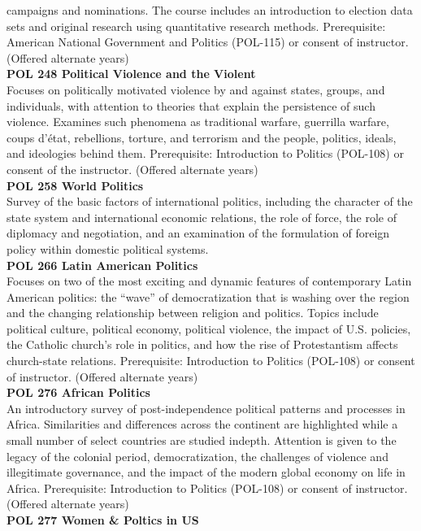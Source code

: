 \documentclass[
  letterpaper,
]{scrbook}
\begin{document}
campaigns and nominations. The course includes an introduction to
election data sets and original research using quantitative research
methods. Prerequisite: American National Government and Politics
(POL-115) or consent of instructor. (Offered alternate years)\\
\textbf{POL 248 Political Violence and the Violent}\\
Focuses on politically motivated violence by and against states, groups,
and individuals, with attention to theories that explain the persistence
of such violence. Examines such phenomena as traditional warfare,
guerrilla warfare, coups d'état, rebellions, torture, and terrorism and
the people, politics, ideals, and ideologies behind them. Prerequisite:
Introduction to Politics (POL-108) or consent of the instructor.
(Offered alternate years)\\
\textbf{POL 258 World Politics}\\
Survey of the basic factors of international politics, including the
character of the state system and international economic relations, the
role of force, the role of diplomacy and negotiation, and an examination
of the formulation of foreign policy within domestic political
systems.\\
\textbf{POL 266 Latin American Politics}\\
Focuses on two of the most exciting and dynamic features of contemporary
Latin American politics: the ``wave'' of democratization that is washing
over the region and the changing relationship between religion and
politics. Topics include political culture, political economy, political
violence, the impact of U.S. policies, the Catholic church's role in
politics, and how the rise of Protestantism affects church-state
relations. Prerequisite: Introduction to Politics (POL-108) or consent
of instructor. (Offered alternate years)\\
\textbf{POL 276 African Politics}\\
An introductory survey of post-independence political patterns and
processes in Africa. Similarities and differences across the continent
are highlighted while a small number of select countries are studied
indepth. Attention is given to the legacy of the colonial period,
democratization, the challenges of violence and illegitimate governance,
and the impact of the modern global economy on life in Africa.
Prerequisite: Introduction to Politics (POL-108) or consent of
instructor. (Offered alternate years)\\
\textbf{POL 277 Women \& Poltics in US}\\
\end{document}
